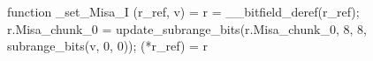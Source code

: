 function _set_Misa_I (r_ref, v) = {
    r = __bitfield_deref(r_ref);
    r.Misa_chunk_0 = update_subrange_bits(r.Misa_chunk_0, 8, 8, subrange_bits(v, 0, 0));
    (*r_ref) = r
}
